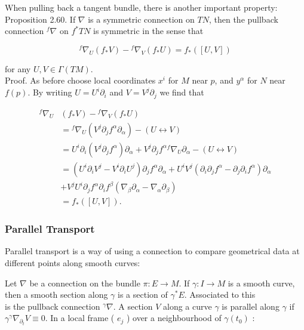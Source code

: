 \documentclass[10pt, letterpaper]{article}
\begin{document}
When pulling back a tangent bundle, there is another important property:\\
Proposition 2.60. If $\nabla$ is a symmetric connection on $T N$, then the pullback connection ${ }^{f} \nabla$ on $f^{*} T N$ is symmetric in the sense that

$$
{ }^{f} \nabla_{U}\left(f_{*} V\right)-{ }^{f} \nabla_{V}\left(f_{*} U\right)=f_{*}([U, V])
$$

for any $U, V \in \Gamma(T M)$.\\
Proof. As before choose local coordinates $x^{i}$ for $M$ near $p$, and $y^{\alpha}$ for $N$ near $f(p)$. By writing $U=U^{i} \partial_{i}$ and $V=V^{j} \partial_{j}$ we find that

$$
\begin{aligned}
{ }^{f} \nabla_{U} & \left(f_{*} V\right)-{ }^{f} \nabla_{V}\left(f_{*} U\right) \\
& ={ }^{f} \nabla_{U}\left(V^{j} \partial_{j} f^{\alpha} \partial_{\alpha}\right)-(U \leftrightarrow V) \\
& =U^{i} \partial_{i}\left(V^{j} \partial_{j} f^{\alpha}\right) \partial_{\alpha}+V^{j} \partial_{j} f^{\alpha}{ }^{f} \nabla_{U} \partial_{\alpha}-(U \leftrightarrow V) \\
& =\left(U^{i} \partial_{i} V^{j}-V^{i} \partial_{i} U^{j}\right) \partial_{j} f^{\alpha} \partial_{\alpha}+U^{i} V^{j}\left(\partial_{i} \partial_{j} f^{\alpha}-\partial_{j} \partial_{i} f^{\alpha}\right) \partial_{\alpha} \\
& +V^{j} U^{i} \partial_{j} f^{\alpha} \partial_{i} f^{\beta}\left(\nabla_{\beta} \partial_{\alpha}-\nabla_{\alpha} \partial_{\beta}\right) \\
& =f_{*}([U, V]) .
\end{aligned}
$$

\subsubsection*{Parallel Transport}
Parallel transport is a way of using a connection to compare geometrical data at different points along smooth curves:

Let $\nabla$ be a connection on the bundle $\pi: E \rightarrow M$. If $\gamma: I \rightarrow M$ is a smooth curve, then a smooth section along $\gamma$ is a section of $\gamma^{*} E$. Associated to this\\
is the pullback connection ${ }^{\gamma} \nabla$. A section $V$ along a curve $\gamma$ is parallel along $\gamma$ if $\gamma^{\gamma} \nabla_{\partial_{t}} V \equiv 0$. In a local frame ( $e_{j}$ ) over a neighbourhood of $\gamma\left(t_{0}\right)$ :
\end{document}
